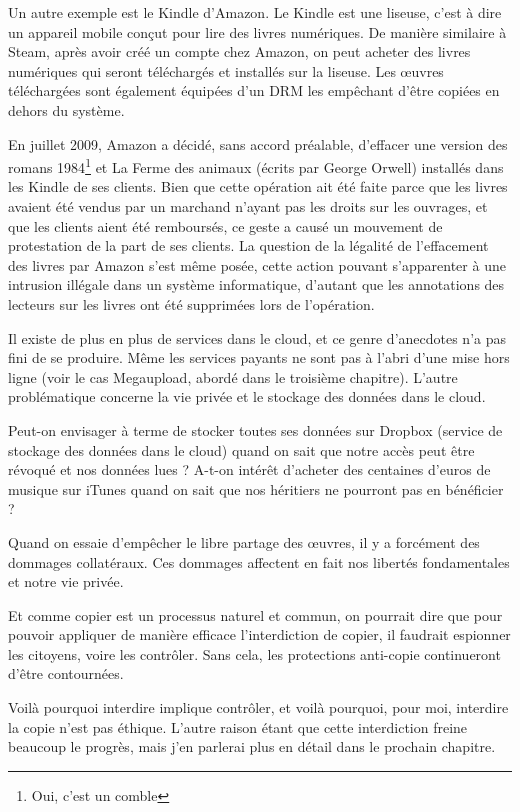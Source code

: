 Un autre exemple est le Kindle d'Amazon.
Le Kindle est une liseuse, c'est à dire un appareil mobile conçut pour lire des livres numériques.
De manière similaire à Steam, après avoir créé un compte chez Amazon, on peut acheter des livres numériques qui seront téléchargés et installés sur la liseuse.
Les œuvres téléchargées sont également équipées d'un DRM les empêchant d'être copiées en dehors du système.

En juillet 2009, Amazon a décidé, sans accord préalable, d'effacer une version des romans 1984\footnote{Oui, c'est un comble} et La Ferme des animaux (écrits par George Orwell) installés dans les Kindle de ses clients.
Bien que cette opération ait été faite parce que les livres avaient été vendus par un marchand n'ayant pas les droits sur les ouvrages, et que les clients aient été remboursés, ce geste a causé un mouvement de protestation de la part de ses clients.
La question de la légalité de l'effacement des livres par Amazon s'est même posée, cette action pouvant s'apparenter à une intrusion illégale dans un système informatique, d'autant que les annotations des lecteurs sur les livres ont été supprimées lors de l'opération.

Il existe de plus en plus de services dans le cloud, et ce genre d'anecdotes n'a pas fini de se produire.
Même les services payants ne sont pas à l'abri d'une mise hors ligne (voir le cas Megaupload, abordé dans le troisième chapitre).
L'autre problématique concerne la vie privée et le stockage des données dans le cloud.

Peut-on envisager à terme de stocker toutes ses données sur Dropbox (service de stockage des données dans le cloud) quand on sait que notre accès peut être révoqué et nos données lues ?
A-t-on intérêt d'acheter des centaines d'euros de musique sur iTunes quand on sait que nos héritiers ne pourront pas en bénéficier ?

Quand on essaie d'empêcher le libre partage des œuvres, il y a forcément des dommages collatéraux.
Ces dommages affectent en fait nos libertés fondamentales et notre vie privée.

Et comme copier est un processus naturel et commun, on pourrait dire que pour pouvoir appliquer de manière efficace l'interdiction de copier, il faudrait espionner les citoyens, voire les contrôler.
Sans cela, les protections anti-copie continueront d'être contournées.

Voilà pourquoi interdire implique contrôler, et voilà pourquoi, pour moi, interdire la copie n'est pas éthique.
L'autre raison étant que cette interdiction freine beaucoup le progrès, mais j'en parlerai plus en détail dans le prochain chapitre.

